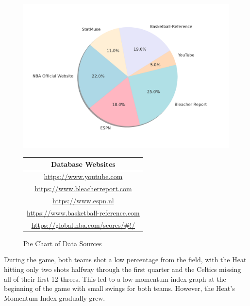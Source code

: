 \documentclass[12pt]{article}  %
\begin{document}
\begin{figure}[htbp]
    \centering
    \begin{minipage}{0.45\textwidth} %
        \centering
        \includegraphics[width=\textwidth]{picture/第四问饼状图.pdf} %
        \caption{Pie Chart of Data Sources} %
        \label{fig:example_image} %
    \end{minipage}\hfill %
    \begin{minipage}{0.55\textwidth} %
        \centering
        \label{tab:your_label_here} %
        \begin{tabular}{c} %
            \toprule
            Database Websites \\
            \midrule
            \url{https://www.youtube.com}              \\
            \url{https://www.bleacherreport.com}       \\
            \url{https://www.espn.nl}                  \\
            \url{https://www.basketball-reference.com} \\
            \url{https://global.nba.com/scores/#!/}    \\ \hline

            \bottomrule
        \end{tabular}
    \end{minipage}
\end{figure}

During the game, both teams shot a low percentage from the field, with the Heat hitting only two shots halfway through the first quarter and the Celtics missing all of their first 12 threes. This led to a low momentum index graph at the beginning of the game with small swings for both teams. However, the Heat's Momentum Index gradually grew.
\end{document}
